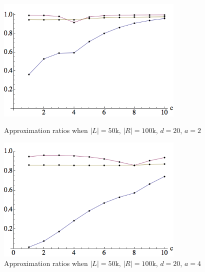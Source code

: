 \begin{figure}[h]
\centering
\begin{minipage}[h]{0.45\textwidth}
\centering
\includegraphics[width=0.8\textwidth]{images/l=50000,r=100000,a=2_Greedy_vs_Naive.png}
\caption{Approximation ratios when $|L|=50$k, $|R|=100$k, $d=20$, $a=2$}\label{fig:a=2}
\end{minipage}
\hspace{0.2cm}
\begin{minipage}[h]{0.45\textwidth}
\centering
\includegraphics[width=0.8\textwidth]{images/l=50000,r=100000,a=4_Greedy_vs_Naive.png}
\caption{Approximation ratios when $|L|=50$k, $|R|=100$k, $d=20$, $a=4$}\label{fig:a=4}
\end{minipage}
\end{figure}
